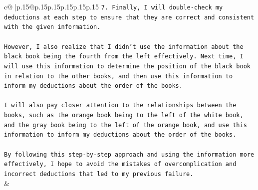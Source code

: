 \documentclass{article}
\begin{document}
{\begin{supertabular}{c@{$\;$}|p{.15\linewidth}@{}p{.15\linewidth}p{.15\linewidth}p{.15\linewidth}p{.15\linewidth}p{.15\linewidth}}
{{{\texttt{7. Finally, I will double{-}check my deductions at each step to ensure that they are correct and consistent with the given information.} \\
\\ 
\texttt{However, I also realize that I didn't use the information about the black book being the fourth from the left effectively. Next time, I will use this information to determine the position of the black book in relation to the other books, and then use this information to inform my deductions about the order of the books.} \\
\\ 
\texttt{I will also pay closer attention to the relationships between the books, such as the orange book being to the left of the white book, and the gray book being to the left of the orange book, and use this information to inform my deductions about the order of the books.} \\
\\ 
\texttt{By following this step{-}by{-}step approach and using the information more effectively, I hope to avoid the mistakes of overcomplication and incorrect deductions that led to my previous failure.} \\
            }
        }
    }
    & \\ \\

\end{supertabular}
}
\end{document}
